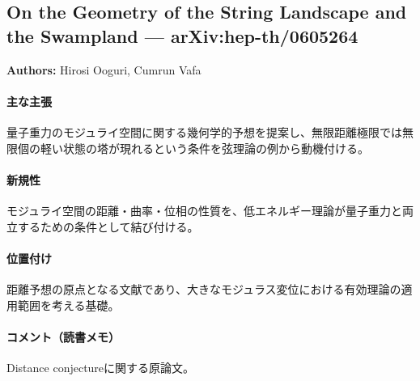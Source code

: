 \subsection{On the Geometry of the String Landscape and the Swampland --- arXiv:hep-th/0605264}

\textbf{Authors:} Hirosi Ooguri, Cumrun Vafa

\paragraph{主な主張}
量子重力のモジュライ空間に関する幾何学的予想を提案し、無限距離極限では無限個の軽い状態の塔が現れるという条件を弦理論の例から動機付ける\cite{Ooguri:2006in}。

\paragraph{新規性}
モジュライ空間の距離・曲率・位相の性質を、低エネルギー理論が量子重力と両立するための条件として結び付ける。

\paragraph{位置付け}
距離予想の原点となる文献であり、大きなモジュラス変位における有効理論の適用範囲を考える基礎。

\paragraph{コメント（読書メモ）}
Distance conjectureに関する原論文。
